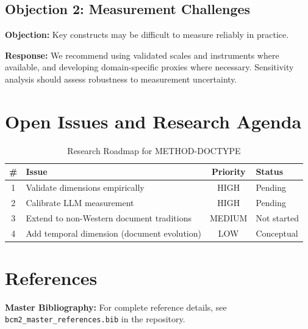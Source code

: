 \subsection{Objection 2: Measurement Challenges}

\textbf{Objection:} Key constructs may be difficult to measure reliably in
practice.

\textbf{Response:} We recommend using validated scales and instruments where
available, and developing domain-specific proxies where necessary. Sensitivity
analysis should assess robustness to measurement uncertainty.


\section{Open Issues and Research Agenda}
\label{sec:doctype-open}

\begin{table}[htbp]
\centering
\caption{Research Roadmap for METHOD-DOCTYPE}
\label{tab:doctype-roadmap}
\renewcommand{\arraystretch}{1.3}
\begin{tabular}{@{}clcl@{}}
\toprule
\textbf{\#} & \textbf{Issue} & \textbf{Priority} & \textbf{Status} \\
\midrule
1 & Validate dimensions empirically & HIGH & Pending \\
2 & Calibrate LLM measurement & HIGH & Pending \\
3 & Extend to non-Western document traditions & MEDIUM & Not started \\
4 & Add temporal dimension (document evolution) & LOW & Conceptual \\
\bottomrule
\end{tabular}
\end{table}


\section{References}
\label{sec:doctype-references}

\begin{tcolorbox}[colback=blue!5!white, colframe=blue!75!black]
\textbf{Master Bibliography:} For complete reference details, see
\texttt{bcm2\_master\_references.bib} in the repository.
\end{tcolorbox}

